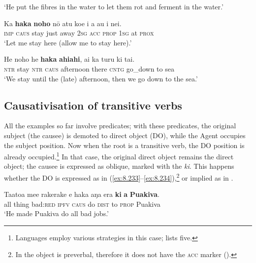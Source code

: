 \glt 
‘He put the fibres in the water to let them rot and ferment in the water.’ \textstyleExampleref{[R352.030]} 
\z

\ea\label{ex:8.231}
\gll Ka \textbf{haka} \textbf{noho} nō atu koe i a au {\ꞌ}i nei. \\
\textsc{imp} \textsc{caus} stay just away \textsc{2sg} \textsc{acc} \textsc{prop} \textsc{1sg} at \textsc{prox} \\

\glt 
‘Let me stay here (allow me to stay here).’ \textstyleExampleref{[R229.013]} 
\z

\ea\label{ex:8.232}
\gll He noho he \textbf{haka} \textbf{ahiahi}, {\ꞌ}ai ka turu ki tai.\\
\textsc{ntr} stay \textsc{ntr} \textsc{caus} afternoon there \textsc{cntg} go\_down to sea\\

\glt 
‘We stay until the (late) afternoon, then we go down to the sea.’ \textstyleExampleref{[R356.008]} 
\z

\subsection{Causativisation of transitive verbs}\label{sec:8.12.3}
All the examples so far involve  predicates; with these predicates, the original subject (the causee) is demoted to direct object (DO), while the  Agent occupies the subject position. Now when the root is a transitive verb, the DO position is already occupied.\footnote{\label{fn:455}Languages employ various strategies in this case; \citet[256 263]{Dixon2012} lists five.}  In that case, the original direct object remains the direct object; the causee is expressed as oblique, marked with the  \textit{ki}. This happens whether the DO is expressed as in (\ref{ex:8.233}–\ref{ex:8.234}),\footnote{\label{fn:456}In  the object is preverbal, therefore it does not have the \textsc{acc} marker ().} or implied as in . 

\ea\label{ex:8.233}
\gll Ta{\ꞌ}ato{\ꞌ}a me{\ꞌ}e rakerake e haka aŋa era \textbf{ki} \textbf{a} \textbf{Puakiva}. \\
all thing bad:\textsc{red} \textsc{ipfv} \textsc{caus} do \textsc{dist} to \textsc{prop} Puakiva \\

\glt 
‘He made Puakiva do all bad jobs.’ \textstyleExampleref{[R229.397]} 
\z

